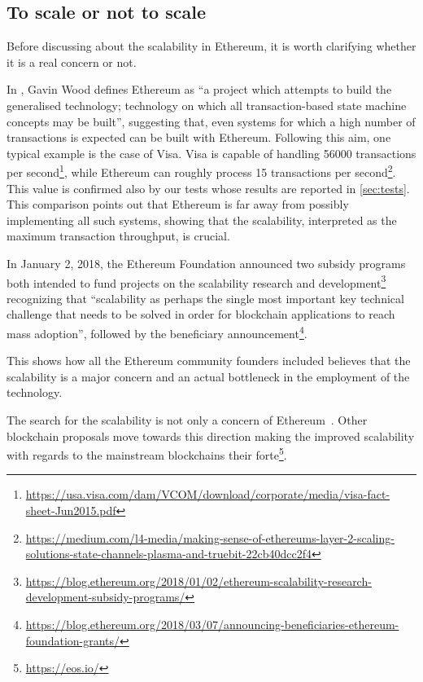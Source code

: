 \subsection{To scale or not to scale}
\label{sec:to-scale-or-not}

Before discussing about the scalability in Ethereum, it is worth
clarifying whether it is a real concern or not.

In \cite{wood2018ethereum}, Gavin Wood defines Ethereum as ``a project which
attempts to build the generalised technology; technology on which all
transaction-based state machine concepts may be built'', suggesting that, even
systems for which a high number of transactions is expected can be built with
Ethereum. Following this aim, one typical example is the case of Visa. Visa is
capable of handling 56000 transactions per
second\footnote{\url{https://usa.visa.com/dam/VCOM/download/corporate/media/visa-fact-sheet-Jun2015.pdf}},
while Ethereum can roughly process 15 transactions per
second\footnote{\url{https://medium.com/l4-media/making-sense-of-ethereums-layer-2-scaling-solutions-state-channels-plasma-and-truebit-22cb40dcc2f4}}.
This value is confirmed also by our tests whose results are reported in
\autoref{sec:tests}. This comparison points out that Ethereum is far away from
possibly implementing all such systems, showing that the scalability,
interpreted as the maximum transaction throughput, is crucial.

In January 2, 2018, the Ethereum Foundation announced two subsidy programs both
intended to fund projects on the scalability research and
development\footnote{\url{https://blog.ethereum.org/2018/01/02/ethereum-scalability-research-development-subsidy-programs/}}
recognizing that ``scalability as perhaps the single most important key
technical challenge that needs to be solved in order for blockchain applications
to reach mass adoption'', followed by the beneficiary
announcement\footnote{\url{https://blog.ethereum.org/2018/03/07/announcing-beneficiaries-ethereum-foundation-grants/}}.

This shows how all the Ethereum community founders included believes that the
scalability is a major concern and an actual bottleneck in the employment of the
technology.

The search for the scalability is not only a concern of
Ethereum~\cite{bib:the-quest}. Other blockchain proposals move towards this
direction making the improved scalability with regards to the mainstream
blockchains their forte\footnote{\url{https://eos.io/}}.
